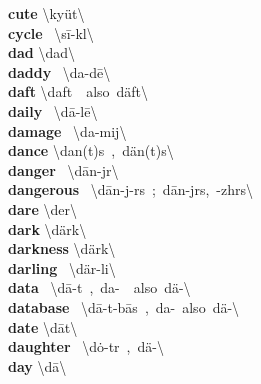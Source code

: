 \documentclass[10pt,a4paper]{article}
\begin{document}
\begin{multicols}{2}
\textbf{ cute }\quad \textbackslash \textprimstress ky\"{u}t\textbackslash \\
\textbf{ cycle }\quad \ \textbackslash \textprimstress s\={i}-k\textschwa l\textbackslash \\
\textbf{ dad }\quad \textbackslash \textprimstress dad\textbackslash \\
\textbf{ daddy }\quad \ \textbackslash \textprimstress da-d\={e}\textbackslash \\
\textbf{ daft }\quad \textbackslash \textprimstress daft\ \ also\ \textprimstress d\"{a}ft\textbackslash \\
\textbf{ daily }\quad \ \textbackslash \textprimstress d\={a}-l\={e}\textbackslash \\
\textbf{ damage }\quad \ \textbackslash \textprimstress da-mij\textbackslash \\
\textbf{ dance }\quad \textbackslash \textprimstress dan(t)s\ ,\ \textprimstress d\"{a}n(t)s\textbackslash \\
\textbf{ danger }\quad \ \textbackslash \textprimstress d\={a}n-j\textschwa r\textbackslash \\
\textbf{ dangerous }\quad \ \textbackslash \textprimstress d\={a}n-j\textschwa -r\textschwa s\ ;\ \textprimstress d\={a}n-j\textschwa rs,\ -zhr\textschwa s\textbackslash \\
\textbf{ dare }\quad \textbackslash \textprimstress der\textbackslash \\
\textbf{ dark }\quad \textbackslash \textprimstress d\"{a}rk\textbackslash \\
\textbf{ darkness }\quad \textbackslash \textprimstress d\"{a}rk\textbackslash \\
\textbf{ darling }\quad \ \textbackslash \textprimstress d\"{a}r-li\engma \textbackslash \\
\textbf{ data }\quad \ \textbackslash \textprimstress d\={a}-t\textschwa \ ,\ \textprimstress da-\ \ also\ \textprimstress d\"{a}-\textbackslash \\
\textbf{ database }\quad \ \textbackslash \textprimstress d\={a}-t\textschwa -\textsecstress b\={a}s\ ,\ \textprimstress da-\ also\ \textprimstress d\"{a}-\textbackslash \\
\textbf{ date }\quad \textbackslash \textprimstress d\={a}t\textbackslash \\
\textbf{ daughter }\quad \ \textbackslash \textprimstress d\.{o}-t\textschwa r\ ,\ \textprimstress d\"{a}-\textbackslash \\
\textbf{ day }\quad \textbackslash \textprimstress d\={a}\textbackslash \\

\end{multicols}
\end{document}
